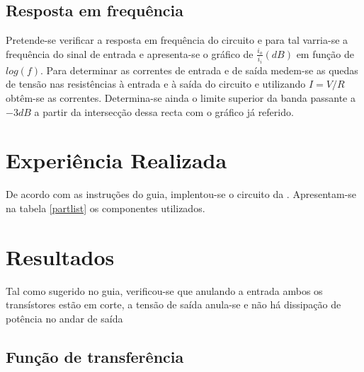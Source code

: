 \documentclass[%
  reprint,
  nofootinbib,
  amsmath,amssymb,
  aps,
  10pt,
  a4paper
]{revtex4-1}
\begin{document}
\subsection{Resposta em frequência}
Pretende-se verificar a resposta em frequência do circuito e para tal varria-se a frequência do sinal de entrada e apresenta-se o gráfico de $\frac{i_o}{i_i} (dB)$ em função de $log(f)$. Para determinar as correntes de entrada e de saída medem-se as quedas de tensão nas resistências à entrada e à saída do circuito e utilizando $I=V/R$ obtêm-se as correntes. Determina-se ainda o limite superior da banda passante a $-3 dB$ a partir da intersecção dessa recta com o gráfico já referido.
\section{Experiência Realizada}
\label{s:expreal}
De acordo com as instruções do guia, implentou-se o circuito da . Apresentam-se na tabela \ref{partlist} os componentes utilizados.




\section{Resultados}
\label{s:resul}

Tal como sugerido no guia, verificou-se que anulando a entrada ambos os transístores estão em corte, a tensão de saída anula-se e não há dissipação de potência no andar de saída

\subsection{Função de transferência}
\end{document}

